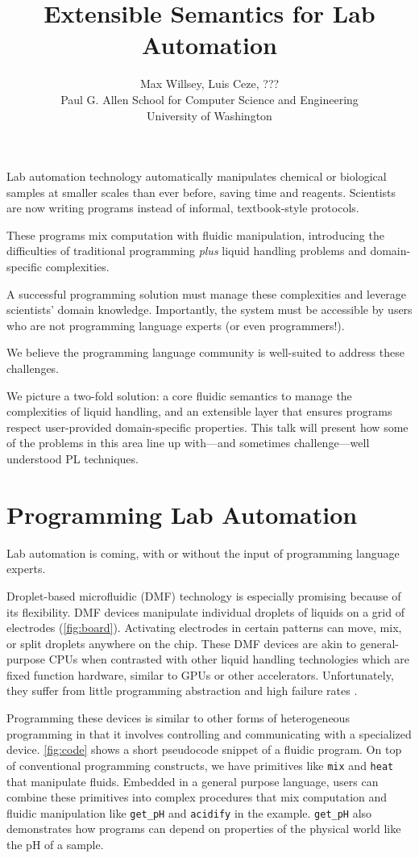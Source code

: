 \documentclass[
  10pt,
  a4paper,
  twocolumn,
]{article}
\title{Extensible Semantics for Lab Automation}
\author{Max Willsey, Luis Ceze, ???
\\ \small Paul G. Allen School for Computer Science and Engineering
\\ \small University of Washington}
\date{}
\begin{document}
\maketitle

Lab automation technology automatically manipulates chemical or biological samples at smaller scales than ever before, saving time and reagents.
Scientists are now writing programs instead of informal, textbook-style protocols.

These programs mix computation with fluidic manipulation, introducing the
difficulties of traditional programming \emph{plus} liquid handling problems and domain-specific complexities.

A successful programming solution must manage these complexities
and leverage scientists' domain knowledge. Importantly, the system must be accessible
by users who are not programming language experts (or even programmers!).

We believe the programming language community is well-suited
to address these challenges.

We picture a two-fold solution:
a core fluidic semantics to manage the complexities of liquid handling,
and an extensible layer that ensures programs respect user-provided domain-specific properties.
This talk will present how some of the problems in this area line up with---and sometimes
challenge---well understood PL techniques.

\section*{Programming Lab Automation}

Lab automation is coming, with or without the input of programming language experts.

Droplet-based microfluidic (DMF) technology is especially promising because of its flexibility.
DMF devices manipulate individual droplets of liquids on a grid of electrodes (\autoref{fig:board}).
Activating electrodes in certain patterns can move, mix, or split droplets anywhere on the chip.
These DMF devices are akin to general-purpose CPUs when contrasted with other liquid handling
technologies which are fixed function hardware,  similar to GPUs or other accelerators.
Unfortunately, they suffer from little programming abstraction and high failure rates \cite{dmf-review}.

Programming these devices is similar to other forms of heterogeneous programming in that
it involves controlling and communicating with a specialized device.
\autoref{fig:code} shows a short pseudocode snippet of a fluidic program.
On top of conventional programming constructs, we have primitives like {\tt mix} and {\tt heat} that manipulate fluids.
Embedded in a general purpose language, users can combine these primitives into complex procedures that mix computation and fluidic manipulation like {\tt get\_pH} and {\tt acidify} in the example.
{\tt get\_pH} also demonstrates how programs can depend on properties of the physical world like the pH of a sample.
\end{document}
